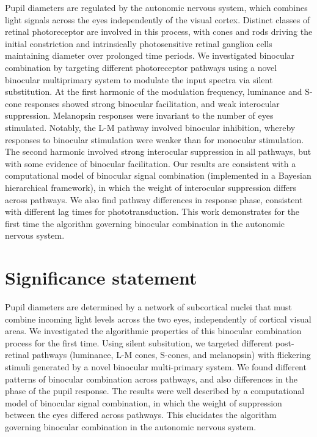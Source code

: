 \documentclass[
]{article}
\begin{document}
Pupil diameters are regulated by the autonomic nervous system, which combines light signals across the eyes independently of the visual cortex. Distinct classes of retinal photoreceptor are involved in this process, with cones and rods driving the initial constriction and intrinsically photosensitive retinal ganglion cells maintaining diameter over prolonged time periods. We investigated binocular combination by targeting different photoreceptor pathways using a novel binocular multiprimary system to modulate the input spectra via silent substitution. At the first harmonic of the modulation frequency, luminance and S-cone responses showed strong binocular facilitation, and weak interocular suppression. Melanopsin responses were invariant to the number of eyes stimulated. Notably, the L-M pathway involved binocular inhibition, whereby responses to binocular stimulation were weaker than for monocular stimulation. The second harmonic involved strong interocular suppression in all pathways, but with some evidence of binocular facilitation. Our results are consistent with a computational model of binocular signal combination (implemented in a Bayesian hierarchical framework), in which the weight of interocular suppression differs across pathways. We also find pathway differences in response phase, consistent with different lag times for phototransduction. This work demonstrates for the first time the algorithm governing binocular combination in the autonomic nervous system.

\section{Significance statement}\label{significance-statement}

Pupil diameters are determined by a network of subcortical nuclei that must combine incoming light levels across the two eyes, independently of cortical visual areas. We investigated the algorithmic properties of this binocular combination process for the first time. Using silent subsitution, we targeted different post-retinal pathways (luminance, L-M cones, S-cones, and melanopsin) with flickering stimuli generated by a novel binocular multi-primary system. We found different patterns of binocular combination across pathways, and also differences in the phase of the pupil response. The results were well described by a computational model of binocular signal combination, in which the weight of suppression between the eyes differed across pathways. This elucidates the algorithm governing binocular combination in the autonomic nervous system.
\end{document}
